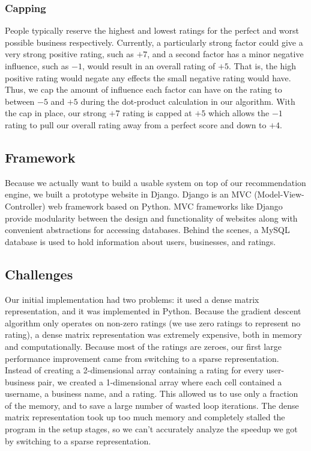 \subsubsection{Capping}

People typically reserve the highest and lowest ratings for the perfect and
worst possible business respectively. Currently, a particularly strong factor
could give a very strong positive rating, such as $+7$, and a second factor has
a minor negative influence, such as $-1$, would result in an overall rating of
$+5$. That is, the high positive rating would negate any effects the small
negative rating would have. Thus, we cap the amount of influence each factor
can have on the rating to between $-5$ and $+5$ during the dot-product calculation
in our algorithm. With the cap in place, our
strong $+7$ rating is capped at $+5$ which allows the $-1$ rating to pull our
overall rating away from a perfect score and down to $+4$. \cite{funk}

\subsection{Framework}

Because we actually want to build a usable system on top of our recommendation
engine, we built a prototype website in Django\cite{django}. Django is an MVC
(Model-View-Controller) web framework based on Python. MVC frameworks like
Django provide modularity between the design and functionality of websites
along with convenient abstractions for accessing databases.  Behind the scenes,
a MySQL database is used to hold information about users, businesses, and
ratings.

\subsection{Challenges}

Our initial implementation had two problems: it used a dense matrix
representation, and it was implemented in Python. Because the gradient descent
algorithm only operates on non-zero ratings (we use zero ratings to represent
no rating), a dense matrix representation was extremely expensive, both in
memory and computationally. Because most of the ratings are zeroes, our first
large performance improvement came from switching to a sparse representation.
Instead of creating a 2-dimensional array containing a rating for every
user-business pair, we created a 1-dimensional array where each cell contained a
username, a business name, and a rating. This allowed us to use only a fraction
of the memory, and to save a large number of wasted loop iterations. The dense
matrix representation took up too much memory and completely stalled the program
in the setup stages, so we can't accurately analyze the speedup we got by
switching to a sparse representation.

